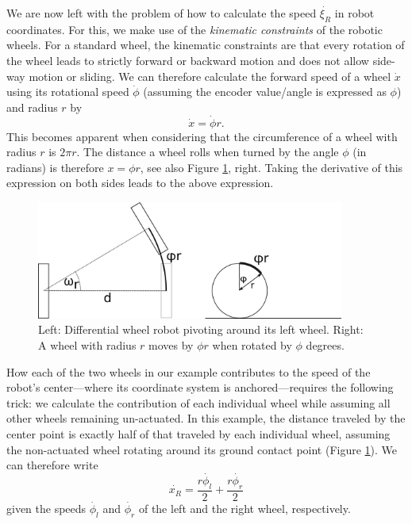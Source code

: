 We are now left with the problem of how to calculate the speed $ \dot{\xi_R}$ in robot coordinates. For this, we make use of the \emph{kinematic constraints} of the robotic wheels. For a standard wheel, the kinematic constraints are that every rotation of the wheel leads to strictly forward or backward motion and does not allow side-way motion or sliding. We can therefore calculate the forward speed of a wheel $ \dot{x}$ using its rotational speed $ \dot{\phi}$ (assuming the encoder value/angle is expressed as $ \phi$) and radius $ r$ by 
\begin{equation}
\dot{x}=\dot{\phi}r.
\end{equation}
This becomes apparent when considering that the circumference of a wheel with radius $r$ is $2\pi r$. The distance a wheel rolls when turned by the angle $ \phi$ (in radians) is therefore $ x=\phi r$, see also Figure \ref{fig:wheelrotation}, right. Taking the derivative of this expression on both sides leads to the above expression.

\begin{figure}[htb!]
	\centering
		\includegraphics[width=0.9\textwidth]{figs/wheelrotation.png}
	\caption{Left: Differential wheel robot pivoting around its left wheel. Right: A wheel with radius $r$ moves by $\phi r$ when rotated by $\phi$ degrees.}
	\label{fig:wheelrotation}
\end{figure}

How each of the two wheels in our example contributes to the speed of the robot's center---where its coordinate system is anchored---requires the following trick: we calculate the contribution of each individual wheel while assuming all other wheels remaining un-actuated. In this example, the distance traveled by the center point is exactly half of that traveled by each individual wheel, assuming the non-actuated wheel rotating around its ground contact point (Figure \ref{fig:wheelrotation}). We can therefore write
\begin{equation}
\dot{x_R}=\frac{r\dot{\phi_l}}{2}+\frac{r\dot{\phi_r}}{2}
\end{equation}
given the speeds $ \dot{\phi_l}$ and $ \dot{\phi_r}$ of the left and the right wheel, respectively.

